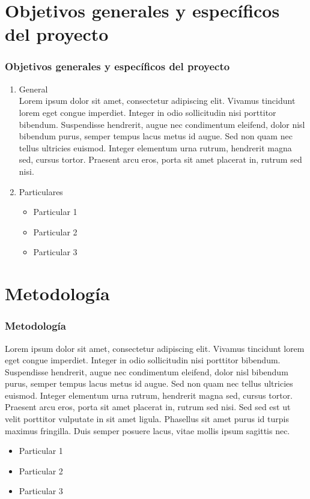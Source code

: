 \documentclass[
	11pt, %
]{beamer}
\begin{document}
\section{Objetivos generales y específicos del proyecto}

\begin{frame}
  
  \frametitle{Objetivos generales y específicos del proyecto}

  \begin{enumerate}
  \item General \\

    Lorem ipsum dolor sit amet, consectetur adipiscing elit. Vivamus tincidunt lorem eget congue imperdiet. Integer in odio sollicitudin nisi porttitor bibendum. Suspendisse hendrerit, augue nec condimentum eleifend, dolor nisl bibendum purus, semper tempus lacus metus id augue. Sed non quam nec tellus ultricies euismod. Integer elementum urna rutrum, hendrerit magna sed, cursus tortor. Praesent arcu eros, porta sit amet placerat in, rutrum sed nisi. \\
        
  \item Particulares\\

    \begin{itemize}
    \item Particular 1
    \item Particular 2
    \item Particular 3
    \end{itemize}
    
  \end{enumerate}
\end{frame}

\section{Metodología}

\begin{frame}

  \frametitle{Metodología}
  \bigskip %

  Lorem ipsum dolor sit amet, consectetur adipiscing elit. Vivamus tincidunt lorem eget congue imperdiet. Integer in odio sollicitudin nisi porttitor bibendum. Suspendisse hendrerit, augue nec condimentum eleifend, dolor nisl bibendum purus, semper tempus lacus metus id augue. Sed non quam nec tellus ultricies euismod. Integer elementum urna rutrum, hendrerit magna sed, cursus tortor. Praesent arcu eros, porta sit amet placerat in, rutrum sed nisi. Sed sed est ut velit porttitor vulputate in sit amet ligula. Phasellus sit amet purus id turpis maximus fringilla. Duis semper posuere lacus, vitae mollis ipsum sagittis nec.\\
  
  \begin{itemize}
  \item Particular 1
  \item Particular 2
  \item Particular 3
  \end{itemize}
\end{frame}
\end{document}
